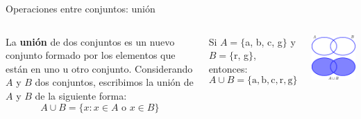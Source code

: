 \documentclass[9pt, aspectratio=169]{beamer}
\begin{document}
\begin{frame}{Operaciones entre conjuntos: unión}
\begin{columns}[c]
\cx
\begin{definition}
    La \textbf{unión} de dos conjuntos es un nuevo conjunto formado por los elementos que están en uno u otro conjunto. Considerando $A$ y $B$ dos conjuntos, escribimos la unión de $A$ y $B$ de la siguiente forma:
    \[ A \cup B = \{ x : x \in A \text{ o } x \in B \} \]
\end{definition}

\begin{example}
    Si $A = \{$a, b, c, g$\}$ y $B = \{$r, g$\}$, entonces:
    \[ A \cup B = \{\text{a}, \text{b}, \text{c}, \text{r}, \text{g} \} \]
\end{example}

\cx
\begin{center}
    \includegraphics[scale=1.0]{figs/fig-04.pdf}
\end{center}
\end{columns}
\end{frame}
\end{document}
